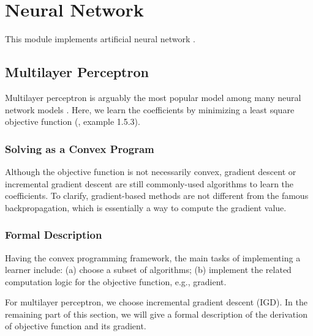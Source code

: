 
\chapter{Neural Network}

This module implements artificial neural network \cite{ann_wiki}.

\section{Multilayer Perceptron}
Multilayer perceptron is arguably the most popular model among many neural network models \cite{mlp_wiki}.
Here, we learn the coefficients by minimizing a least square objective function (\cite{bertsekas1999nonlinear}, example 1.5.3).

\subsection{Solving as a Convex Program}
Although the objective function is not necessarily convex, gradient descent or incremental gradient descent are still commonly-used algorithms to learn the coefficients.
To clarify, gradient-based methods are not different from the famous backpropagation, which is essentially a way to compute the gradient value.

\subsection{Formal Description}
Having the convex programming framework, the main tasks of implementing a learner include:
(a) choose a subset of algorithms;
(b) implement the related computation logic for the objective function, e.g., gradient.

For multilayer perceptron, we choose incremental gradient descent (IGD).
In the remaining part of this section, we will give a formal description of the derivation of objective function and its gradient.

